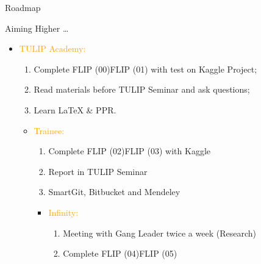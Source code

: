 \documentclass[
 size=14pt,
 paper=smartboard,  %
 mode=present, 		%
 display=slides, 	%
 pauseslide,
 fleqn,leqno]{powerdot}{}
\newcommand*{\info}[4][4]{%
  \node [ annotation, #3, text width = #1em,
          inner sep = 2mm ] at (#2) {%
  \list{$\bullet$}{\topsep=0pt\itemsep=0pt\parsep=0pt
    \parskip=0pt\labelwidth=2pt\leftmargin=2pt
    \itemindent=0pt\labelsep=2pt}%
    #4
  \endlist
  };
}
\begin{document}
\begin{slide}[toc=,bm=]{Roadmap}
\begin{center}
\end{center}
\end{slide}


\begin{slide}{Aiming Higher \dots}
    \begin{itemize}
      \item \textcolor{orange}{TULIP Academy:}
       \begin{enumerate}
         \item Complete FLIP (00)\texttildelow FLIP (01) with test on Kaggle Project;
         \item Read materials before TULIP Seminar and ask questions;
         \item Learn \LaTeX{} \& PPR.
       \end{enumerate}
       \begin{itemize}
         \item \textcolor{orange}{Trainee:}
         \begin{enumerate}
           \item Complete  FLIP (02)\texttildelow FLIP (03) with Kaggle
           \item Report in TULIP Seminar
           \item SmartGit, Bitbucket and Mendeley
         \end{enumerate}
         \begin{itemize}
           \item \textcolor{orange}{Infinity:}
            \begin{enumerate}
              \item Meeting with Gang Leader twice a week (Research)
              \item Complete  FLIP (04)\texttildelow FLIP (05)
            \end{enumerate}
         \end{itemize}
       \end{itemize}

    \end{itemize}
\end{slide}
\end{document}
